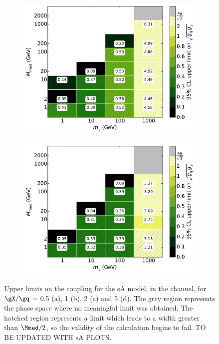 \begin{figure}[h]
\begin{subfigure}[t]{0.495\textwidth}
      \includegraphics[width=1.\textwidth]{figures/grid_basepoints_SVD_rat2_monojet.pdf}
      \caption{}
    \end{subfigure}
    \begin{subfigure}[t]{0.495\textwidth}
      \centering
      \includegraphics[width=1.\textwidth]{figures/grid_basepoints_SVD_rat5_monojet.pdf}
      \caption{}
    \end{subfigure}
    \caption{Upper limits on the coupling for the sA model, in the \monojet channel, for $\gX / \gq$ = 0.5 (a), 1 (b), 2 (c) and 5 (d). The grey region represents the phase space where no meaningful limit was obtained. The hatched region represents a limit which leads to a width greater than $\Mmed / 2$, so the validity of the calculation begins to fail. TO BE UPDATED WITH sA PLOTS.}
    \label{fig:Monojet_SVD_couplinglimit}
\end{figure}

